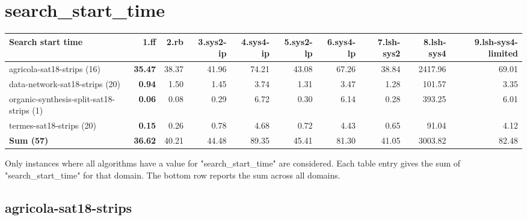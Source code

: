 \documentclass{article}
\newcommand{\numtasks}[1]{\small{(#1)}}
\begin{document}
\hypertarget{search_start_time}{}
\section*{search\_start\_time}

\begin{tabular}{@{}lrrrrrrrrr@{}}
Search start time & 1.ff & 2.rb & 3.sys2-ip & 4.sys4-ip & 5.sys2-lp & 6.sys4-lp & 7.lsh-sys2 & 8.lsh-sys4 & 9.lsh-sys4-limited \\
\midrule
agricola-sat18-strips \numtasks{16} & \textbf{35.47} & 38.37 & 41.96 & 74.21 & 43.08 & 67.26 & 38.84 & 2417.96 & 69.01 \\
data-network-sat18-strips \numtasks{20} & \textbf{0.94} & 1.50 & 1.45 & 3.74 & 1.31 & 3.47 & 1.28 & 101.57 & 3.35 \\
organic-synthesis-split-sat18-strips \numtasks{1} & \textbf{0.06} & 0.08 & 0.29 & 6.72 & 0.30 & 6.14 & 0.28 & 393.25 & 6.01 \\
termes-sat18-strips \numtasks{20} & \textbf{0.15} & 0.26 & 0.78 & 4.68 & 0.72 & 4.43 & 0.65 & 91.04 & 4.12 \\
\textbf{Sum \numtasks{57}} & \textbf{36.62} & 40.21 & 44.48 & 89.35 & 45.41 & 81.30 & 41.05 & 3003.82 & 82.48 \\
\end{tabular}

Only instances where all algorithms have a value for "search\_start\_time" are considered. Each table entry gives the sum of "search\_start\_time" for that domain. The bottom row reports the sum across all domains.

\hypertarget{search_start_time-agricola-sat18-strips}{}
\subsection*{agricola-sat18-strips}
\end{document}
